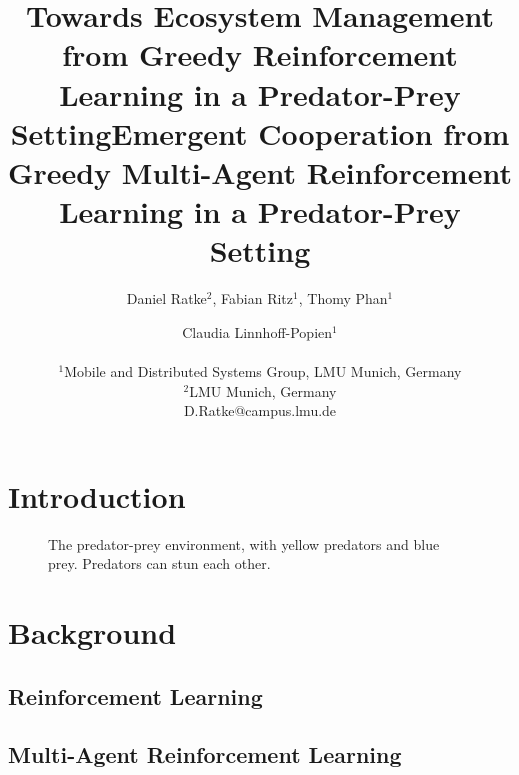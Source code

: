 \documentclass[letterpaper]{article}
\title{Towards Ecosystem Management from Greedy Reinforcement Learning in a Predator-Prey Setting}
\title{Emergent Cooperation from Greedy Multi-Agent Reinforcement Learning in a Predator-Prey Setting}
\author{Daniel Ratke$^{2}$, Fabian Ritz$^{1}$, Thomy Phan$^1$ \and Claudia Linnhoff-Popien$^1$ \\
\mbox{}\\
$^1$Mobile and Distributed Systems Group, LMU Munich, Germany \\
$^2$LMU Munich, Germany \\
D.Ratke@campus.lmu.de} %
\begin{document}
\maketitle

\begin{abstract}
    \blindtext[2]
\end{abstract}

\section{Introduction}

\blindtext[4]

\begin{figure}%
    \centering
    \caption{The predator-prey environment, with yellow predators and blue prey. Predators can stun each other.}%
    \label{fig:aquarium}%
\end{figure}

\section{Background}

\subsection{Reinforcement Learning}

\blindtext[2]

\subsection{Multi-Agent Reinforcement Learning}
\end{document}
